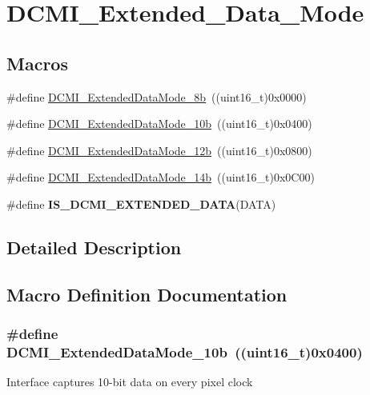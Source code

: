 \hypertarget{group___d_c_m_i___extended___data___mode}{\section{D\-C\-M\-I\-\_\-\-Extended\-\_\-\-Data\-\_\-\-Mode}
\label{group___d_c_m_i___extended___data___mode}
}
\subsection*{Macros}
\begin{DoxyCompactItemize}
\item 
\#define \hyperlink{group___d_c_m_i___extended___data___mode_ga01627fb1fcd0d0682628e5bea8e5dfba}{D\-C\-M\-I\-\_\-\-Extended\-Data\-Mode\-\_\-8b}~((uint16\-\_\-t)0x0000)
\item 
\#define \hyperlink{group___d_c_m_i___extended___data___mode_gad47d200f9e2bf947dd07b9f8bc395336}{D\-C\-M\-I\-\_\-\-Extended\-Data\-Mode\-\_\-10b}~((uint16\-\_\-t)0x0400)
\item 
\#define \hyperlink{group___d_c_m_i___extended___data___mode_ga183733b7d784387200aa00b988c906da}{D\-C\-M\-I\-\_\-\-Extended\-Data\-Mode\-\_\-12b}~((uint16\-\_\-t)0x0800)
\item 
\#define \hyperlink{group___d_c_m_i___extended___data___mode_gae1a4ca9b9a1929a40213758e80d38e15}{D\-C\-M\-I\-\_\-\-Extended\-Data\-Mode\-\_\-14b}~((uint16\-\_\-t)0x0\-C00)
\item 
\#define {\bfseries I\-S\-\_\-\-D\-C\-M\-I\-\_\-\-E\-X\-T\-E\-N\-D\-E\-D\-\_\-\-D\-A\-T\-A}(D\-A\-T\-A)
\end{DoxyCompactItemize}


\subsection{Detailed Description}


\subsection{Macro Definition Documentation}
\hypertarget{group___d_c_m_i___extended___data___mode_gad47d200f9e2bf947dd07b9f8bc395336}{
\subsubsection[{D\-C\-M\-I\-\_\-\-Extended\-Data\-Mode\-\_\-10b}]{\setlength{\rightskip}{0pt plus 5cm}\#define D\-C\-M\-I\-\_\-\-Extended\-Data\-Mode\-\_\-10b~((uint16\-\_\-t)0x0400)}}\label{group___d_c_m_i___extended___data___mode_gad47d200f9e2bf947dd07b9f8bc395336}
Interface captures 10-\/bit data on every pixel clock 

